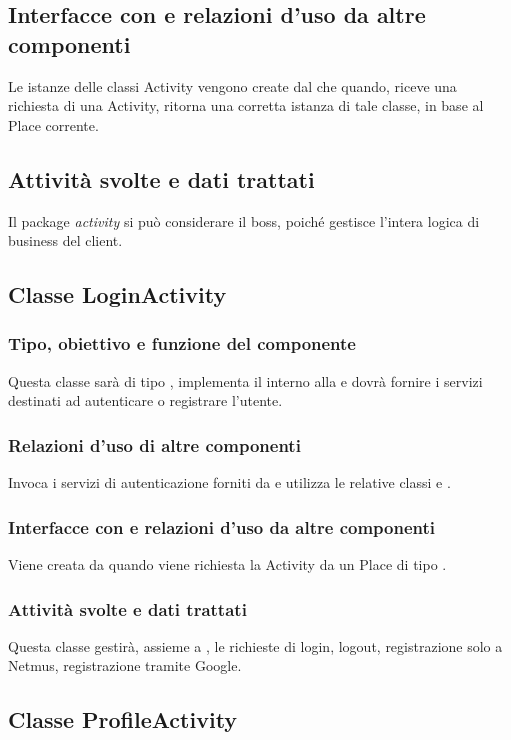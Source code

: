 \subsection*{Interfacce con e relazioni d'uso da altre componenti} 
Le istanze delle classi Activity vengono create dal 
che quando, riceve una richiesta di una Activity, ritorna una corretta istanza
di tale classe, in base al Place corrente.
\subsection*{Attivit\`a svolte e dati trattati}
Il package \emph{activity} si pu\`o considerare il boss, poich\'e gestisce
l'intera logica di business del client.

\subsection{Classe LoginActivity}
\subsubsection*{Tipo, obiettivo e funzione del componente}
Questa classe sar\`a di tipo , implementa il 
interno alla  e dovr\`a fornire i servizi destinati ad autenticare
o registrare l'utente.
\subsubsection*{Relazioni d'uso di altre componenti}
Invoca i servizi di autenticazione forniti da  e utilizza
le relative classi  e .
\subsubsection*{Interfacce con e relazioni d'uso da altre componenti} 
Viene creata da  quando viene richiesta la Activity da
un Place di tipo .
\subsubsection*{Attivit\`a svolte e dati trattati}
Questa classe gestir\`a, assieme a , le richieste di login,
logout, registrazione solo a Netmus, registrazione tramite Google.

\subsection{Classe ProfileActivity}
